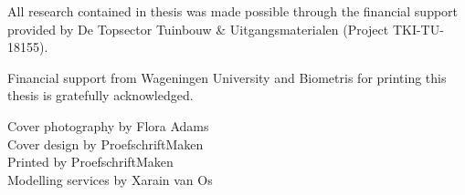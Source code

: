 \vspace*{1cm}
All research contained in thesis was made possible through the financial support provided by De Topsector Tuinbouw \& Uitgangsmaterialen (Project TKI-TU-18155).
 
Financial support from Wageningen University and Biometris for printing this 
thesis is gratefully acknowledged.


\vspace*{\fill}
Cover photography by Flora Adams \\
Cover design by ProefschriftMaken \\
Printed by ProefschriftMaken \\
Modelling services by Xarain van Os
